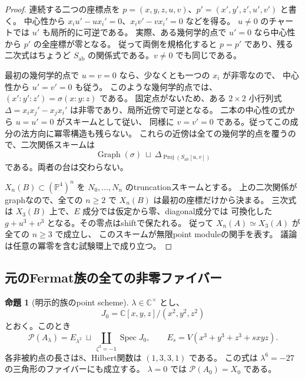 \documentclass[a4paper,11pt]{ltjsarticle}
\newcommand{\mathscr}{\mathcal}
\theoremstyle{definition}
\newtheorem{theorem}{命題}[section]
\newcommand{\CC}{\mathbb C}
\newcommand{\PP}{\mathbb P}
\begin{document}
\begin{proof}
連続する二つの座標点を
$p=(x,y,z,u,v)$、$p'=(x',y',z',u',v')$ と書く。
中心性から $x_iu'-ux_i'=0$、$x_iv'-vx_i'=0$ などを得る。
$u\ne0$ のチャートでは $u'$ も局所的に可逆である。
実際、ある幾何学的点で $u'=0$ なら中心性から $p'$ の全座標が零となる。
従って両側を規格化すると $p=p'$ であり、残る二次式はちょうど
$S_{\mathrm{ab}}$ の関係式である。$v\ne0$ でも同じである。

最初の幾何学的点で $u=v=0$ なら、少なくとも一つの $x_i$ が非零なので、
中心性から $u'=v'=0$ も従う。
このような幾何学的点では、
$(x':y':z')=\sigma(x:y:z)$ である。
固定点がないため、ある $2\times2$ 小行列式
$\Delta=x_ix_j'-x_jx_i'$ は非零であり、局所近傍で可逆となる。
二本の中心性の式から $u=u'=0$ がスキームとして従い、
同様に $v=v'=0$ である。従ってこの成分の法方向に冪零構造も残らない。
これらの近傍は全ての幾何学的点を覆うので、二次関係スキームは
\[
 \operatorname{Graph}(\sigma)\ \sqcup\
 \Delta_{\operatorname{Proj}(S_{\mathrm{ab}}[u,v])}
\]
である。両者の台は交わらない。

$X_n(B)\subset(\PP^4)^n$ を $N_0,\ldots,N_n$ のtruncationスキームとする。
上の二次関係がgraphなので、全ての $n\ge2$ で
$X_n(B)$ は最初の座標だけから決まる。
三次式は $X_3(B)$ 上で、$E$ 成分では仮定から零、diagonal成分では
可換化した $g+u^3+v^3$ となる。その零点はshiftで保たれる。
従って $X_n(A)\simeq X_3(A)$ が全ての $n\ge3$ で成立し、
このスキームが無限point moduleの関手を表す。
議論は任意の冪零を含む試験環上で成り立つ。
\end{proof}

\subsection{元のFermat族の全ての非零ファイバー}

\begin{theorem}[明示的族のpoint scheme]\label{thm:point-scheme}
$\lambda\in\CC^\times$ とし、
\[
 J_0=\CC[x,y,z]/(x^2,y^2,z^2)
\]
とおく。このとき
\[
 \boxed{
 \mathscr P(A_\lambda)
 =E_{\lambda^2}\ \sqcup\
 \coprod_{\zeta^3=-1}\operatorname{Spec}J_0
 },\qquad
 E_s=V(x^3+y^3+z^3+sxyz).
\]
各非被約点の長さは8、Hilbert関数は $(1,3,3,1)$ である。
この式は $\lambda^6=-27$ の三角形のファイバーにも成立する。
$\lambda=0$ では $\mathscr P(A_0)=X_0$ である。
\end{theorem}
\end{document}
